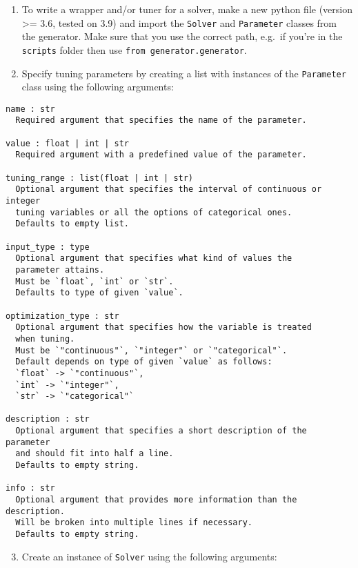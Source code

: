 \documentclass[]{article}
\date{}
\providecommand{\tightlist}{%
  \setlength{\itemsep}{0pt}\setlength{\parskip}{0pt}}
\begin{document}
\begin{enumerate}

\item
  To write a wrapper and/or tuner for a solver, make a new python file
  (version \textgreater{}= 3.6, tested on 3.9) and import the
  \texttt{Solver} and \texttt{Parameter} classes from the generator.
  Make sure that you use the correct path, e.g.~if you're in the
  \texttt{scripts} folder then use \texttt{from\ generator.generator}.
\item
  Specify tuning parameters by creating a list with instances of the
  \texttt{Parameter} class using the following arguments:
\end{enumerate}

\begin{verbatim}
name : str
  Required argument that specifies the name of the parameter.

value : float | int | str
  Required argument with a predefined value of the parameter.

tuning_range : list(float | int | str)
  Optional argument that specifies the interval of continuous or integer
  tuning variables or all the options of categorical ones.
  Defaults to empty list.

input_type : type
  Optional argument that specifies what kind of values the
  parameter attains.
  Must be `float`, `int` or `str`.
  Defaults to type of given `value`.

optimization_type : str
  Optional argument that specifies how the variable is treated
  when tuning.
  Must be `"continuous"`, `"integer"` or `"categorical"`.
  Default depends on type of given `value` as follows:
  `float` -> `"continuous"`,
  `int` -> `"integer"`,
  `str` -> `"categorical"`

description : str
  Optional argument that specifies a short description of the parameter
  and should fit into half a line.
  Defaults to empty string.

info : str
  Optional argument that provides more information than the description.
  Will be broken into multiple lines if necessary.
  Defaults to empty string.
\end{verbatim}

\begin{enumerate}

\setcounter{enumi}{2}
\tightlist
\item
  Create an instance of \texttt{Solver} using the following arguments:
\end{enumerate}
\end{document}
